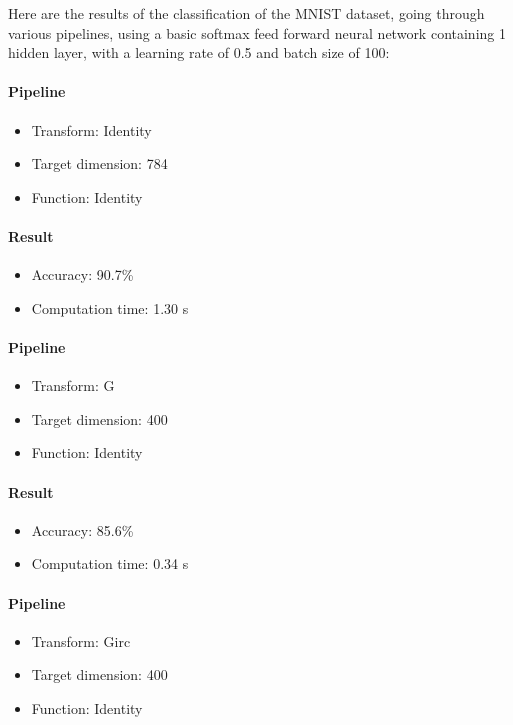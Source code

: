 \documentclass[11pt,a4paper]{article}
\begin{document}
	
	Here are the results of the classification of the MNIST dataset, going through various pipelines, using a basic softmax feed forward neural network containing 1 hidden layer, with a learning rate of 0.5 and batch size of 100:
	

	
	\paragraph{Pipeline}
	\begin{itemize}
			\item Transform: Identity
			\item Target dimension: 784
			\item Function: Identity
	\end{itemize}
	 \paragraph{Result}
	 \begin{itemize}
			\item Accuracy: 90.7\%
			\item Computation time: 1.30 s
	\end{itemize}



	\paragraph{Pipeline}
	\begin{itemize}
		\item Transform: G
		\item Target dimension: 400
		\item Function: Identity
	\end{itemize}
	\paragraph{Result}
	\begin{itemize}
		\item Accuracy: 85.6\%
		\item Computation time: 0.34 s
	\end{itemize}
	
	
		\paragraph{Pipeline}
		\begin{itemize}
			\item Transform: Girc
			\item Target dimension: 400
			\item Function: Identity
		\end{itemize}
\end{document}
